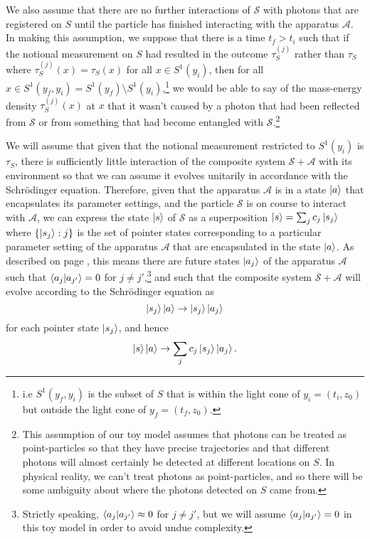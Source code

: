 We also assume that there are no further interactions of $\mathcal{S}$ with photons that are registered on $S$ until the particle has finished interacting with the apparatus $\mathcal{A}$.  In making this assumption, we suppose that there is a time $t_f>t_i$ such that if the notional measurement on $S$ had resulted in the outcome $\tau_S^{(j)}$ rather than $\tau_S$ where $\tau_S^{(j)}(x)=\tau_S(x)$ for all $x\in S^1(y_i)$, then for all $x \in S^1(y_f,y_i)=S^1(y_f)\setminus S^1(y_i)$,\footnote{i.e $S^1(y_f,y_i)$ is the subset of $S$ that is within the light cone of $y_i=(t_i, z_0)$ but outside the light cone of $y_f=(t_f, z_0)$.} we would be able to say of the mass-energy density $\tau_S^{(j)}(x)$ at $x$ that it wasn't caused by a photon that had been reflected from $\mathcal{S}$ or from something that had become entangled with $\mathcal{S}$.\footnote{This assumption of our toy model assumes that photons can be treated as point-particles so that they have precise trajectories and that different photons will almost certainly be detected at different locations on $S$. In physical reality, we can't treat photons as point-particles, and so there will be some ambiguity about where the photons detected on $S$ came from.}

We will assume that given that the notional measurement restricted to $S^1(y_i)$ is $\tau_S$, there is sufficiently little interaction of the composite system $\mathcal{S}+\mathcal{A}$ with its environment so that we can assume it evolves unitarily in accordance with the Schr\"{o}dinger equation. Therefore, given that the apparatus $\mathcal{A}$ is in a state $\ket{a}$ that encapsulates its parameter settings, and the particle $\mathcal{S}$ is on course to interact with $\mathcal{A}$, we can express the state $\ket{s}$ of $\mathcal{S}$ as a superposition $\ket{s}=\sum_j c_j \ket{s_j}$ where $\{\ket{s_j}:j\}$ is the set of pointer states corresponding to a particular parameter setting of the apparatus $\mathcal{A}$ that are encapsulated in the state $\ket{a}$. As described on page \pageref{pointer}, this means there are future states $\ket{a_j}$ of the apparatus $\mathcal{A}$ such that $\ip{a_j}{a_{j'}}=0$ for $j\neq j'$,\footnote{Strictly speaking, $\ip{a_j}{a_{j'}}\approx 0$ for $j\neq j'$, but we will assume $\ip{a_j}{a_{j'}}=0$ in this toy model in order to avoid undue complexity.} and such that the composite system $\mathcal{S}+\mathcal{A}$ will evolve according to the Schr\"{o}dinger equation as
$$\ket{s_j}\ket{a}\rightarrow \ket{s_j}\ket{a_j} $$
for each pointer state $\ket{s_j}$, and hence
\begin{equation}\label{saevolution}
\ket{s}\ket{a}\rightarrow \sum_j c_j \ket{s_j}\ket{a_j}.
\end{equation}

